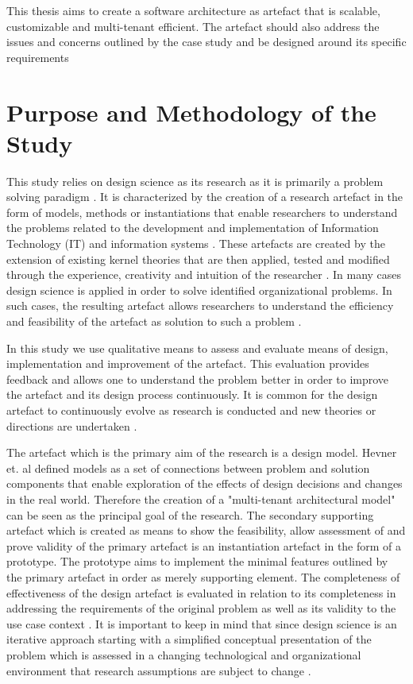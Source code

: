 \begin{fancyquotes}
This thesis aims to create a software architecture as artefact that is scalable, customizable and multi-tenant efficient. The artefact should also address the issues and concerns outlined by the case study and be designed around its specific requirements
\end{fancyquotes}

\section{Purpose and Methodology of the Study}

This study relies on design science as its research as it is primarily a problem solving paradigm \cite{Hevner2004}. It is characterized by the creation of a research artefact in the form of models, methods or instantiations that enable researchers to understand the problems related to the development and implementation of Information Technology (IT) and information systems \cite{March1995a}. These artefacts are created by the extension of existing kernel theories that are then applied, tested and modified through the experience, creativity and intuition of the researcher \cite{Walls1992}. In many cases design science is applied in order to solve identified organizational problems. In such cases, the resulting artefact allows researchers to understand the efficiency and feasibility of the artefact as solution to such a problem \cite{Hevner2004}.
 
In this study we use qualitative means to assess and evaluate means of design, implementation and improvement of the artefact. This evaluation provides feedback and allows one to understand the problem better in order to improve the artefact and its design process continuously. It is common for the design artefact to continuously evolve as research is conducted and new theories or directions are undertaken \cite{Hevner2004}.
 
The artefact which is the primary aim of the research is a design model. Hevner et. al \cite{Hevner2004} defined models as a set of connections between problem and solution components that enable exploration of the effects of design decisions and changes in the real world. Therefore the creation of a "multi-tenant architectural model" can be seen as the principal goal of the research. The secondary supporting artefact which is created as means to show the feasibility, allow assessment of and prove validity of the primary artefact is an instantiation artefact \cite{Hevner2004} in the form of a prototype. The prototype aims to implement the minimal features outlined by the primary artefact in order as merely supporting element. The completeness of effectiveness of the design artefact is evaluated in relation to its completeness in addressing the requirements of the original problem as well as its validity to the use case context \cite{Hevner2004}. It is important to keep in mind that since design science is an iterative approach starting with a simplified conceptual presentation of the problem which is assessed in a changing technological and organizational environment that research assumptions are subject to change \cite{Johansson2000}.


